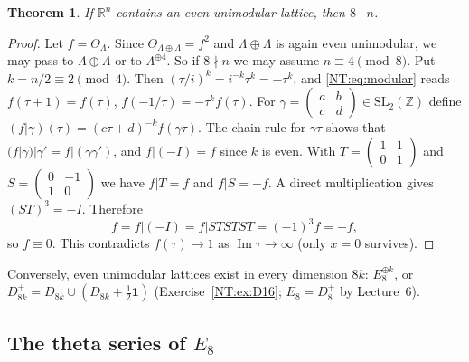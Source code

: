 \documentclass[11pt,openany]{book}
\theoremstyle{plain}
\newtheorem{theorem}{Theorem}[chapter]
\theoremstyle{definition}
\theoremstyle{remark}
\newcommand{\R}{\mathbb{R}}
\newcommand{\Z}{\mathbb{Z}}
\newcommand{\Lat}{\Lambda}             %
\newcommand{\SL}{\mathrm{SL}}
\begin{document}
\begin{theorem}\label{NT:thm:8n}
If $\R^n$ contains an even unimodular lattice, then $8\mid n$.
\end{theorem}

\begin{proof}
Let $f=\Theta_\Lat$. Since $\Theta_{\Lat\oplus\Lat}=f^2$ and $\Lat\oplus\Lat$ is again even unimodular,
we may pass to $\Lat\oplus\Lat$ or to $\Lat^{\oplus4}$. So if $8\nmid n$ we may assume $n\equiv4\pmod 8$.
Put $k=n/2\equiv2\pmod4$. Then $(\tau/i)^{k}=i^{-k}\tau^k=-\tau^k$, and \eqref{NT:eq:modular} reads
$f(\tau+1)=f(\tau)$, $f(-1/\tau)=-\tau^kf(\tau)$. For $\gamma=\left(\begin{smallmatrix}a&b\\c&d\end{smallmatrix}\right)\in\SL_2(\Z)$
define $(f|\gamma)(\tau)=(c\tau+d)^{-k}f(\gamma\tau)$. The chain rule for $\gamma\tau$ shows
that $(f|\gamma)|\gamma'=f|(\gamma\gamma')$, and $f|(-I)=f$ since $k$ is even. With
$T=\left(\begin{smallmatrix}1&1\\0&1\end{smallmatrix}\right)$ and $S=\left(\begin{smallmatrix}0&-1\\1&0\end{smallmatrix}\right)$
we have $f|T=f$ and $f|S=-f$. A direct multiplication gives $(ST)^3=-I$. Therefore
\[
  f=f|(-I)=f|STSTST=(-1)^3f=-f,
\]
so $f\equiv0$. This contradicts $f(\tau)\to1$ as $\operatorname{Im}\tau\to\infty$ (only $x=0$ survives).
\end{proof}

Conversely, even unimodular lattices exist in every dimension $8k$: $E_8^{\oplus k}$, or
$D_{8k}^+=D_{8k}\cup(D_{8k}+\frac12\mathbf 1)$ (Exercise~\ref{NT:ex:D16}; $E_8=D_8^+$ by Lecture~6).

\subsection*{The theta series of \texorpdfstring{$E_8$}{E8}}
\end{document}
